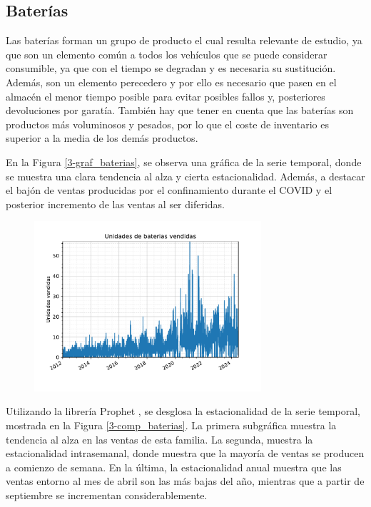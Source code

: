 \subsection{Baterías}

Las baterías forman un grupo de producto el cual resulta relevante de estudio, ya que son un elemento común a todos los vehículos que se puede considerar consumible, ya que con el tiempo se degradan y es necesaria su sustitución. Además, son un elemento perecedero y por ello es necesario que pasen en el almacén el menor tiempo posible para evitar posibles fallos y, posteriores devoluciones por garatía. También hay que tener en cuenta que las baterías son productos más voluminosos y pesados, por lo que el coste de inventario es superior a la media de los demás productos.

En la Figura \ref{3-graf_baterias}, se observa una gráfica de la serie temporal, donde se muestra una clara tendencia al alza y cierta estacionalidad. Además, a destacar el bajón de ventas producidas por el confinamiento durante el COVID y el posterior incremento de las ventas al ser diferidas.

\begin{figure}[H]
	{\includegraphics[width=0.75\textwidth]{imagenes/grafica_baterias.pdf}}
\end{figure}

Utilizando la librería Prophet \cite{prophet}, se desglosa la estacionalidad de la serie temporal, mostrada en la Figura \ref{3-comp_baterias}. La primera subgráfica muestra la tendencia al alza en las ventas de esta familia. La segunda, muestra la estacionalidad intrasemanal, donde muestra que la mayoría de ventas se producen a comienzo de semana. En la última, la estacionalidad anual muestra que las ventas entorno al mes de abril son las más bajas del año, mientras que a partir de septiembre se incrementan considerablemente.


